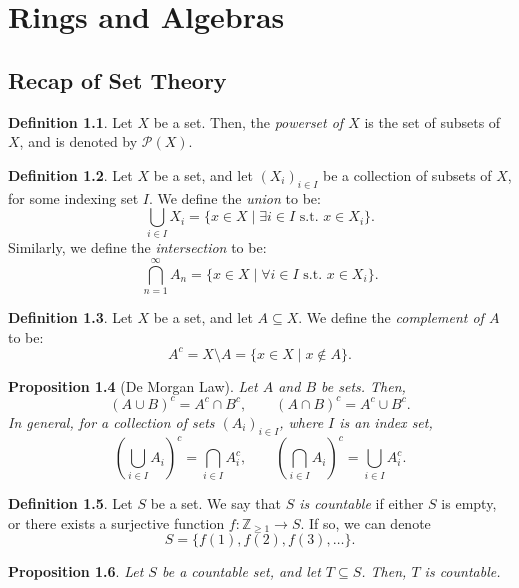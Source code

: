 \documentclass[a4paper, openany]{memoir}
\theoremstyle{definition}
\newtheorem{definition}{Definition}[section]
\theoremstyle{plain}
\newtheorem{proposition}[definition]{Proposition}
\begin{document}
    \chapter{Rings and Algebras}
    \setcounter{section}{-1}
    \section{Recap of Set Theory}
    \begin{definition}
        Let $X$ be a set. Then, the \emph{powerset of $X$} is the set of subsets of $X$, and is denoted by $\mathcal{P}(X)$.
    \end{definition}

    \begin{definition}
        Let $X$ be a set, and let $(X_i)_{i \in I}$ be a collection of subsets of $X$, for some indexing set $I$. We define the \emph{union} to be:
        \[\bigcup_{i \in I} X_i = \{x \in X \mid \exists i \in I \text{ s.t. } x \in X_i\}.\]
        Similarly, we define the \emph{intersection} to be:
        \[\bigcap_{n=1}^\infty A_n = \{x \in X \mid \forall i \in I \text{ s.t. } x \in X_i\}.\]
    \end{definition}

    \begin{definition}
        Let $X$ be a set, and let $A \subseteq X$. We define the \emph{complement of $A$} to be:
        \[A^c = X \setminus A = \{x \in X \mid x \not\in A\}.\]
    \end{definition}

    \begin{proposition}[De Morgan Law]
        Let $A$ and $B$ be sets. Then,
        \[(A \cup B)^c = A^c \cap B^c, \qquad (A \cap B)^c = A^c \cup B^c.\]
        In general, for a collection of sets $(A_i)_{i \in I}$, where $I$ is an index set,
        \[\left(\bigcup_{i \in I} A_i\right)^c = \bigcap_{i \in I} A_i^c, \qquad \left(\bigcap_{i \in I} A_i\right)^c = \bigcup_{i \in I} A_i^c.\]
    \end{proposition}

    \begin{definition}
        Let $S$ be a set. We say that \emph{$S$ is countable} if either $S$ is empty, or there exists a surjective function $f: \mathbb{Z}_{\geq 1} \to S$. If so, we can denote
        \[S = \{f(1), f(2), f(3), \dots\}.\]
    \end{definition}

    \begin{proposition}
        Let $S$ be a countable set, and let $T \subseteq S$. Then, $T$ is countable.
    \end{proposition}
\end{document}
